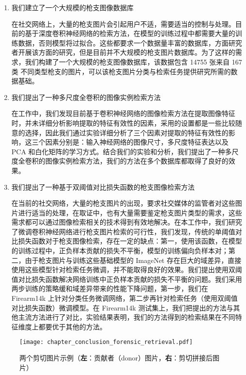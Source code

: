 \begin{enumerate}
\item 我们建立了一个大规模的枪支图像数据库

在社交网络上，大量的枪支图片会引起用户不适，需要适当的控制与处理。目前的基于深度卷积神经网络的检索方法，在模型的训练过程中都需要大量的训练数据，否则模型将过拟合。这些都要求一个数据量丰富的数据库，方面研究者开展该方面的研究，但是目前并不大规模的枪支图片数据库。为了这样的需求，我们构建了一个大规模的枪支图像数据库，该数据包含 14755 张来自 167 类
不同类型枪支的图片，可以该枪支图片分类与检索任务提供研究所需的数据基础。


\item  我们提出了一种多尺度全卷积的图像实例检索方法

在工作中，我们发现目前基于卷积神经网络的图像检索方法在提取图像特征时，并未详细分析影响提取的特征有效性的因素，采用的设置都是一些比较随意的选择，因此我们通过实验详细分析了三个因素对提取的特征有效性的影响，这三个因素分别是：输入神经网络的图像尺寸，多尺度特征表达以及 PCA 和白化矩阵的学习方式。结合我们的实验和分析，我们提出了一种多尺度全卷积的图像实例检索方法，我们的方法在多个数据库都取得了良好的效果。


\item 我们提出了一种基于双阈值对比损失函数的枪支图像检索方法

在当前的社交网络，大量的枪支图片的出现，要求社交媒体的监管者对这些图片进行适当的处理，在取证中，也有大量需要鉴定枪支图片类型的需求，这些需求都可以通过图像检索相关的技术得到有效地解决。在本工作中，我们研究了微调卷积神经网络进行枪支图片检索的可行性，我们发现，传统的单阈值对比损失函数对于枪支图像检索，存在一定的缺点：第一，使用该函数，在模型的训练过程中，正负样本贡献的损失不平衡，模型的训练偏向负样本对；第二，由于枪支图片与训练这些基础模型的 ImageNet 存在巨大的域差异，直接使用这些模型针对检索任务微调，并不能取得良好的效果。我们提出使用双阈值对比损失函数解决网络训练中正负样本贡献的损失不平衡的问题。我们采用两步训练的策略缓和域差异带来的性能下降问题，第一步，我们在 Firearm14k 上针对分类任务微调网络，第二步再针对检索任务（使用双阈值对比损失函数）微调模型。在 Firearm14k 测试集上，我们把提出的方法与其他主流方法进行了对比，实验结果表明，我们的方法得到的检索结果在不同特征维度上都要优于其他的方法。
\end{enumerate}


\begin{figure}
\centering
\texttt{[image: chapter\_conclusion\_forensic\_retrieval.pdf]}
\caption{两个剪切图片示例（\textbf{左}：贡献者（donor）图片，\textbf{右}：剪切拼接后图片）}
\label{fig:forensic_image_retrieval}
\end{figure}

